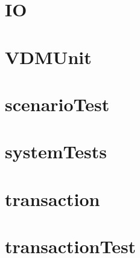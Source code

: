 \documentclass{article}
\begin{document}
\section{IO}


\section{VDMUnit}


\section{scenarioTest}


\section{systemTests}


\section{transaction}


\section{transactionTest}

\end{document}
